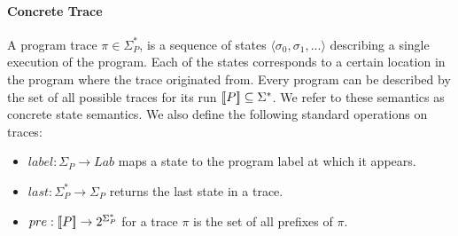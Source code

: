 \paragraph{Concrete Trace} 
A program trace $\pi \in \Sigma^*_{P}$, is a sequence of states $\langle \sigma_0,\sigma_1,... \rangle$ describing a single execution of the program. Each of the states corresponds to a certain location in the program where the trace originated from. Every program can be described by the set of all possible traces for its run $\lbrack\!\lbrack P \rbrack\!\rbrack \subseteq \Sigma^*$. We refer to these semantics as concrete state semantics. We also define the following standard operations on traces:
\begin{itemize}
\item $label : \Sigma_{P} \rightarrow Lab$ maps a state to the program label at which it appears.
\item $last : \Sigma_{P}^* \rightarrow \Sigma_{P}$ returns the last state in a trace.
\item $pre : \lbrack\!\lbrack P \rbrack\!\rbrack \rightarrow 2^{\Sigma_{P}^*}$ for a trace $\pi$ is the set of all prefixes of $\pi$.
\end{itemize}
